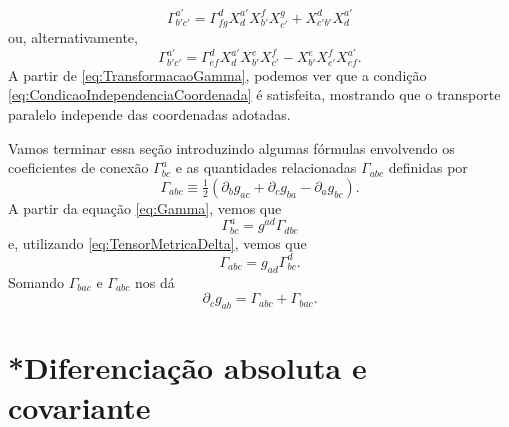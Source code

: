 \begin{equation}\label{eq:TransformacaoGamma}
	\boxed{
		\Gamma^{a'}_{b'c'} = \Gamma^d_{fg}X^{a'}_dX^f_{b'}X^g_{c'}+X^d_{c'b'}X^{a'}_d
	}
\end{equation}
ou, alternativamente,
\begin{equation}\label{eq:TransformacaoGammaAlternativa}
	\boxed{
		\Gamma^{a'}_{b'c'} = \Gamma^d_{ef}X^{a'}_dX^e_{b'}X^f_{c'}-X^e_{b'}X^f_{c'}X^{a'}_{ef} .
	}
\end{equation}
A partir de \eqref{eq:TransformacaoGamma}, podemos ver que a condição \eqref{eq:CondicaoIndependenciaCoordenada} é satisfeita, mostrando que o transporte paralelo independe das coordenadas adotadas.

Vamos terminar essa seção introduzindo algumas fórmulas envolvendo os coeficientes de conexão $\Gamma^a_{bc}$ e as quantidades relacionadas $\Gamma_{abc}$ definidas por
\begin{equation}\label{eq:ChristoffelPrimeiroTipo}
	\Gamma_{abc} \equiv \tfrac{1}{2}(\partial_bg_{ac}+\partial_c g_{ba}-\partial_a g_{bc}).
\end{equation}
A partir da equação \eqref{eq:Gamma}, vemos que
\begin{equation}\label{eq:LevantarIndiceGamma}
	\Gamma^a_{bc}=g^{ad}\Gamma_{dbc}
\end{equation}
e, utilizando \eqref{eq:TensorMetricaDelta}, vemos que
\begin{equation}\label{eq:AbaixarIndiceGamma}
	\Gamma_{abc}=g_{ad}\Gamma^d_{bc}.
\end{equation}
Somando $\Gamma_{bac}$ e $\Gamma_{abc}$ nos dá
\begin{equation}\label{eq:DerivadaMetricaGamma}
	\partial_cg_{ab}=\Gamma_{abc}+\Gamma_{bac}.
\end{equation}

\section{*Diferenciação absoluta e covariante}\label{sec:DiferenciacaoAbsolutaCovariante}

